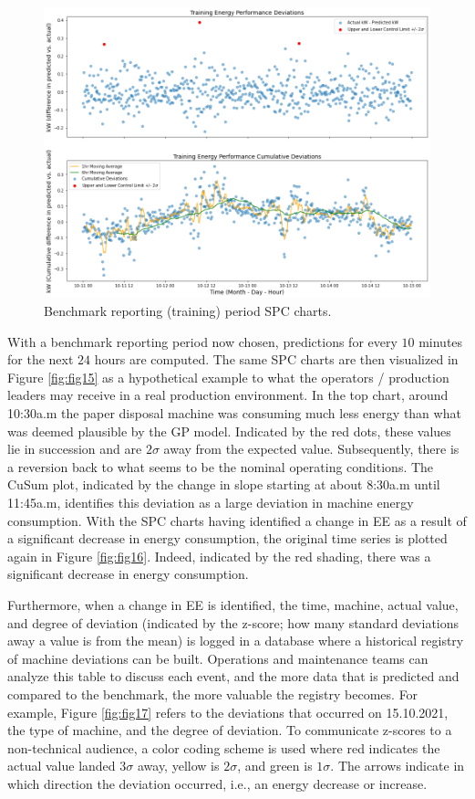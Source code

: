 \begin{figure}[h]
\centering
\graphicspath{ {./images/} }
\includegraphics[scale=0.49]{images/entsorgung_baseline_SPC.png}
\caption{Benchmark reporting (training) period SPC charts.}
\label{fig:fig14}
\end{figure}

With a benchmark reporting period now chosen, predictions for every $10$ minutes for the next $24$ hours are computed. The same SPC charts are then visualized in Figure \ref{fig:fig15} as a hypothetical example to what the operators / production leaders may receive in a real production environment. In the top chart, around 10:30a.m the paper disposal machine was consuming much less energy than what was deemed plausible by the GP model. Indicated by the red dots, these values lie in succession and are $2\sigma$ away from the expected value. Subsequently, there is a reversion back to what seems to be the nominal operating conditions. The CuSum plot, indicated by the change in slope starting at about 8:30a.m until 11:45a.m, identifies this deviation as a large deviation in machine energy consumption. With the SPC charts having identified a change in EE as a result of a significant decrease in energy consumption, the original time series is plotted again in Figure \ref{fig:fig16}. Indeed, indicated by the red shading, there was a significant decrease in energy consumption. 

Furthermore, when a change in EE is identified, the time, machine, actual value, and degree of deviation (indicated by the z-score; how many standard deviations away a value is from the mean) is logged in a database where a historical registry of machine deviations can be built. Operations and maintenance teams can analyze this table to discuss each event, and the more data that is predicted and compared to the benchmark, the more valuable the registry becomes. For example, Figure \ref{fig:fig17} refers to the deviations that occurred on 15.10.2021, the type of machine, and the degree of deviation. To communicate z-scores to a non-technical audience, a color coding scheme is used where red indicates the actual value landed $3\sigma$ away, yellow is $2\sigma$, and green is $1\sigma$. The arrows indicate in which direction the deviation occurred, i.e., an energy decrease or increase.


